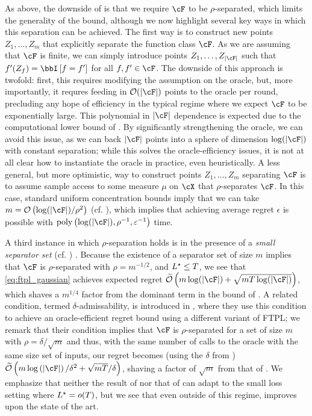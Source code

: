 As above, the downside of  is that we require $\cF$ to be $\rho$-separated, which limits the generality of the bound, although we now highlight several key ways in which this separation can be achieved.  The first way is to construct new points $Z_1, \dots, Z_m$ that explicitly separate the function class $\cF$.  As we are assuming that $\cF$ is finite, we can simply introduce points $Z_1, \dots, Z_{\abs{\cF}}$ such that $f'(Z_f) = \bbI\left[ f = f' \right]$ for all $f, f' \in \cF$.  The downside of this approach is twofold: first, this requires modifying the assumption on the oracle, but, more importantly, it requres feeding in $\bigO(\abs{\cF})$ points to the oracle per round, precluding any hope of efficiency in the typical regime where we expect $\cF$ to be exponentially large.  This polynomial in $\abs{\cF}$ dependence is expected due to the computational lower bound of \citet{hazan2016computational}.  By significantly strengthening the oracle, we can avoid this issue, as we can back $\abs{\cF}$ points into a sphere of dimension $\log(\abs{\cF})$ with constant separation; while this solves the oracle-efficiency issues, it is not at all clear how to instantiate the oracle in practice, even heuristically.
A less general, but more optimistic, way to construct points $Z_1, \dots, Z_m$ separating $\cF$ is to assume sample access to some measure $\mu$ on $\cX$ that $\rho$-separates $\cF$.  In this case, standard uniform concentration bounds imply that we can take $m = \bigO\left( \log(\abs{\cF})  / \rho^2\right)$ (cf. ), which implies that achieving average regret $\epsilon$ is possible with $\poly\left( \log(\abs{\cF}) , \rho^{-1}, \epsilon^{-1}\right)$ time. 

A third instance in which $\rho$-separation holds is in the presence of a \emph{small separator set} (cf. ) \citep{goldman1993exact,syrgkanis2016efficient}.  Because the existence of a separator set of size $m$ implies that $\cF$ is $\rho$-separated  with $\rho = m^{-1/2}$,  and $L^\star \leq T$, we see that \eqref{eq:ftpl_gaussian} achieves expected regret $\bigOtil\left( m \log(\abs{\cF}) + \sqrt{m T \log (\abs{\cF})} \right)$, which shaves a $m^{1/4}$ factor from the dominant term in the bound of \citet[Theorem 2]{syrgkanis2016efficient}.  A related condition, termed $\delta$-admissability, is introduced in \citet{dudik2020oracle}, where they use this condition to achieve an oracle-efficient regret bound using a different variant of FTPL; we remark that their condition implies that $\cF$ is $\rho$-separated for a set of size $m$ with $\rho = \delta / \sqrt{m}$ and thus, with the same number of calls to the oracle with the same size set of inputs, our regret becomes (using the $\delta$ from \citet{dudik2020oracle}) $\bigOtil\left( m \log\left( \abs{\cF} \right) / \delta^2 + \sqrt{m T} / \delta \right)$, shaving a factor of $\sqrt{m}$ from that of \citet[Theorem 2.5]{dudik2020oracle}.  We emphasize that neither the result of \citet{syrgkanis2016efficient} nor that of \citet{dudik2020oracle} can adapt to the small loss setting where $L^\star = o(T)$, but we see that even outside of this regime,  improves upon the state of the art.

